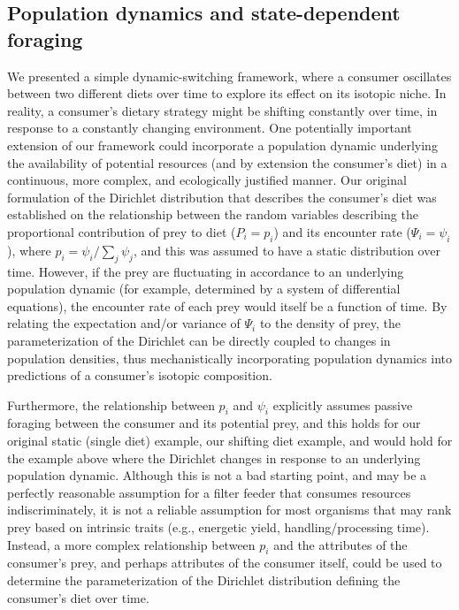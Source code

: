 \documentclass{frontiersSCNS}
\begin{document}
\subsection*{Population dynamics and state-dependent foraging}
We presented a simple dynamic-switching framework, where a consumer oscillates between two different diets over time to explore its effect on its isotopic niche.
In reality, a consumer's dietary strategy might be shifting constantly over time, in response to a constantly changing environment.
One potentially important extension of our framework could incorporate a population dynamic underlying the availability of potential resources (and by extension the consumer's diet) in a continuous, more complex, and ecologically justified manner.
Our original formulation of the Dirichlet distribution that describes the consumer's diet was established on the relationship between the random variables describing the proportional contribution of prey to diet ($P_i = p_i$) and its encounter rate ($\Psi_i = \psi_i$), where $p_i = \psi_i/\sum_j \psi_j$, and this was assumed to have a static distribution over time.
However, if the prey are fluctuating in accordance to an underlying population dynamic (for example, determined by a system of differential equations), the encounter rate of each prey would itself be a function of time.
By relating the expectation and/or variance of $\Psi_i$ to the density of prey, the parameterization of the Dirichlet can be directly coupled to changes in population densities, thus mechanistically incorporating population dynamics into predictions of a consumer's isotopic composition.


Furthermore, the relationship between $p_i$ and $\psi_i$ explicitly assumes passive foraging between the consumer and its potential prey, and this holds for our original static (single diet) example, our shifting diet example, and would hold for the example above where the Dirichlet changes in response to an underlying population dynamic.
Although this is not a bad starting point, and may be a perfectly reasonable assumption for a filter feeder that consumes resources indiscriminately, it is not a reliable assumption for most organisms that may rank prey based on intrinsic traits (e.g., energetic yield, handling/processing time).
Instead, a more complex relationship between $p_i$ and the attributes of the consumer's prey, and perhaps attributes of the consumer itself, could be used to determine the parameterization of the Dirichlet distribution defining the consumer's diet over time.
\end{document}
